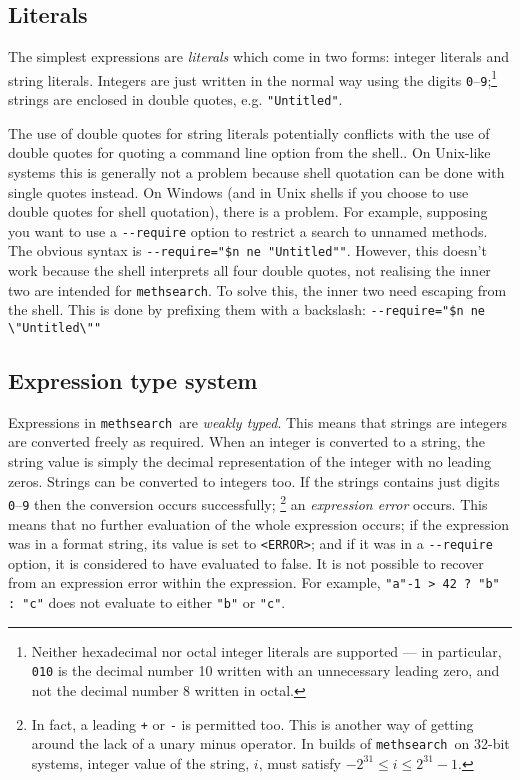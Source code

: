 \documentclass[a4paper,11pt,oneside]{book}
\def\textitidx#1{\textit{#1}\index{#1}}
\def\methsearch{\texttt{meth\-search}}
\begin{document}

\subsection{Literals}\label{lits}

The simplest expressions are \textitidx{literals} which come in two forms:
integer literals and string literals.  Integers are just written in the normal way using the digits
\verb+0+--\verb+9+;\footnote{Neither hexadecimal nor octal integer literals
are supported --- in particular, \verb+010+ is the decimal number 10 written
with an unnecessary leading zero, and not the decimal number 8 written in 
octal.}  strings are enclosed in double quotes, e.g. \verb+"Untitled"+.

The use of double quotes for string literals potentially conflicts with
the use of double quotes for quoting a command line option from the 
shell..  On Unix-like systems this is generally not a 
problem because shell quotation can be done with single quotes instead.  On
Windows (and in Unix shells if you choose to use double quotes for 
shell quotation), there is a problem.  For example, supposing you want to
use a \verb+--require+ option to restrict a search to unnamed methods.  The 
obvious syntax is \verb+--require="$n ne "Untitled""+.  However, this doesn't
work because the shell interprets all four double quotes, not realising the
inner two are intended for \methsearch.  To solve this, the inner two
need escaping  
from the shell.  This is done by prefixing them with 
a backslash: 
\verb+--require="$n ne \"Untitled\""+

\subsection{Expression type system}

Expressions in \methsearch\ are \textit{weakly typed}. 
This means that strings are integers are converted freely as required.
When an integer is converted to a string, the string value is simply the
decimal representation of the integer with no leading zeros.  
Strings can be converted to integers too.  If the strings contains just
digits \verb+0+--\verb+9+ then the conversion occurs successfully;%
\footnote{In fact, a leading \verb-+- or \verb+-+ is permitted too.  
This is another way of getting around the lack of a unary minus operator.%
  In builds of \methsearch\ on 32-bit
systems, integer value of the string, $i$, must satisfy 
$-2^{31} \le i \le 2^{31}-1$.}
an \textitidx{expression error} occurs.  This means that no further evaluation
of the whole expression occurs; if the expression was in a format string,
its value is set to \verb+<ERROR>+; and if it was in a \verb+--require+ option,
it is considered to have evaluated to false.  It is not possible to recover
from an expression error within the expression.  For example, 
\verb+"a"-1 > 42 ? "b" : "c"+ does not evaluate to either 
\verb+"b"+ or \verb+"c"+.
\end{document}
